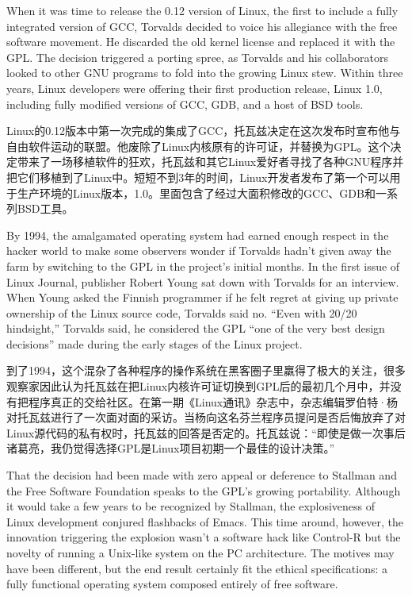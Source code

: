 \ifdefined\eng
When it was time to release the 0.12 version of Linux, the first to include a fully integrated version of GCC, Torvalds decided to voice his allegiance with the free software movement. He discarded the old kernel license and replaced it with the GPL. The decision triggered a porting spree, as Torvalds and his collaborators looked to other GNU programs to fold into the growing Linux stew. Within three years, Linux developers were offering their first production release, Linux 1.0, including fully modified versions of GCC, GDB, and a host of BSD tools.
\fi

\ifdefined\chs
Linux的0.12版本中第一次完成的集成了GCC，托瓦兹决定在这次发布时宣布他与自由软件运动的联盟。他废除了Linux内核原有的许可证，并替换为GPL。这个决定带来了一场移植软件的狂欢，托瓦兹和其它Linux爱好者寻找了各种GNU程序并把它们移植到了Linux中。短短不到3年的时间，Linux开发者发布了第一个可以用于生产环境的Linux版本，1.0。里面包含了经过大面积修改的GCC、GDB和一系列BSD工具。
\fi


\ifdefined\eng
By 1994, the amalgamated operating system had earned enough respect in the hacker world to make some observers wonder if Torvalds hadn't given away the farm by switching to the GPL in the project's initial months. In the first issue of Linux Journal, publisher Robert Young sat down with Torvalds for an interview. When Young asked the Finnish programmer if he felt regret at giving up private ownership of the Linux source code, Torvalds said no. ``Even with 20/20 hindsight,'' Torvalds said, he considered the GPL ``one of the very best design decisions'' made during the early stages of the Linux project.
\fi

\ifdefined\chs
到了1994，这个混杂了各种程序的操作系统在黑客圈子里羸得了极大的关注，很多观察家因此认为托瓦兹在把Linux内核许可证切换到GPL后的最初几个月中，并没有把程序真正的交给社区。在第一期《Linux通讯》杂志中，杂志编辑罗伯特·杨对托瓦兹进行了一次面对面的采访。当杨向这名芬兰程序员提问是否后悔放弃了对Linux源代码的私有权时，托瓦兹的回答是否定的。托瓦兹说：``即使是做一次事后诸葛亮，我仍觉得选择GPL是Linux项目初期一个最佳的设计决策。''
\fi

\ifdefined\eng
That the decision had been made with zero appeal or deference to Stallman and the Free Software Foundation speaks to the GPL's growing portability. Although it would take a few years to be recognized by Stallman, the explosiveness of Linux development conjured flashbacks of Emacs. This time around, however, the innovation triggering the explosion wasn't a software hack like Control-R but the novelty of running a Unix-like system on the PC architecture. The motives may have been different, but the end result certainly fit the ethical specifications: a fully functional operating system composed entirely of free software.
\fi

